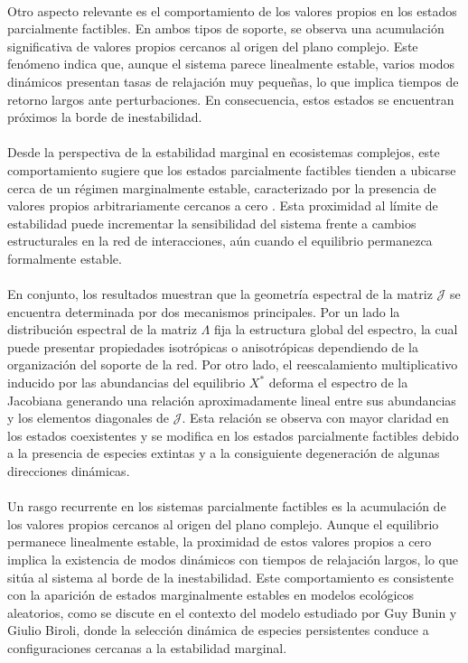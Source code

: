 \\
Otro aspecto relevante es el comportamiento de los valores propios en los estados parcialmente factibles. En ambos tipos de soporte, se observa una acumulación significativa de valores propios cercanos al origen del plano complejo. Este fenómeno indica que, aunque el sistema parece linealmente estable, varios modos dinámicos presentan tasas de relajación muy pequeñas, lo que implica tiempos de retorno largos ante perturbaciones. En consecuencia, estos estados se encuentran próximos la borde de inestabilidad.\\
\\
Desde la perspectiva de la estabilidad marginal en ecosistemas complejos, este comportamiento sugiere que los estados parcialmente factibles tienden a ubicarse cerca de un régimen marginalmente estable, caracterizado por la presencia de valores propios arbitrariamente cercanos a cero \cite{bunin2017ecological,biroli2018marginally}. Esta proximidad al límite de estabilidad puede incrementar la sensibilidad del sistema frente a cambios estructurales en la red de interacciones, aún cuando el equilibrio permanezca formalmente estable.\\
\\
En conjunto, los resultados muestran que la geometría espectral de la matriz $\mathcal{J}$ se encuentra determinada por dos mecanismos principales. Por un lado la distribución espectral de la matriz $\Lambda$ fija la estructura global del espectro, la cual puede presentar propiedades isotrópicas o anisotrópicas dependiendo de la organización del soporte de la red. Por otro lado, el reescalamiento multiplicativo inducido por las abundancias del equilibrio $X^*$ deforma el espectro de la Jacobiana  generando una relación aproximadamente lineal entre sus abundancias y los elementos diagonales de $\mathcal{J}$. Esta relación se observa con mayor claridad en los estados coexistentes y se modifica en los estados parcialmente factibles debido a la presencia de especies extintas y a la consiguiente degeneración de algunas direcciones dinámicas.\\
\\
Un rasgo recurrente en los sistemas parcialmente factibles es la acumulación de los valores propios cercanos al origen del plano complejo.  Aunque el equilibrio permanece linealmente estable, la proximidad de estos valores propios a cero implica la existencia de modos dinámicos con tiempos de relajación largos, lo que sitúa al sistema al borde de la inestabilidad. Este comportamiento es consistente con la aparición de estados marginalmente estables en modelos ecológicos aleatorios, como se discute en el contexto del modelo estudiado por Guy Bunin y Giulio Biroli, donde la selección dinámica de especies persistentes conduce a configuraciones cercanas a la estabilidad marginal.\\
